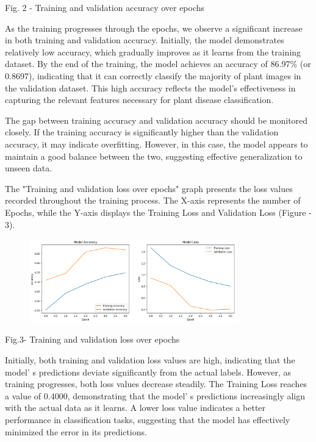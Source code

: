{{Fig. 2 - Training and validation accuracy over epochs

As the training progresses through the epochs, we observe a significant
increase in both training and validation accuracy. Initially, the model
demonstrates relatively low accuracy, which gradually improves as it
learns from the training dataset. By the end of the training, the model
achieves an accuracy of 86.97\% (or 0.8697), indicating that it can
correctly classify the majority of plant images in the validation
dataset. This high accuracy reflects the model's effectiveness in
capturing the relevant features necessary for plant disease
classification.

The gap between training accuracy and validation accuracy should be
monitored closely. If the training accuracy is significantly higher than
the validation accuracy, it may indicate overfitting. However, in this
case, the model appears to maintain a good balance between the two,
suggesting effective generalization to unseen data.

The "Training and validation loss over epochs" graph presents the loss
values recorded throughout the training process. The X-axis represents
the number of Epochs, while the Y-axis displays the Training Loss and
Validation Loss (Figure - 3).

\begin{figure}[H]
	\centering
	\includegraphics[width=0.8\textwidth]{media/ict/image32}
	\caption*{}
\end{figure}


Fig.3- Training and validation loss over epochs

Initially, both training and validation loss values are high, indicating
that the model' s predictions deviate significantly from
the actual labels. However, as training progresses, both loss values
decrease steadily. The Training Loss reaches a value of 0.4000,
demonstrating that the model' s predictions increasingly
align with the actual data as it learns. A lower loss value indicates a
better performance in classification tasks, suggesting that the model
has effectively minimized the error in its predictions.

}}
